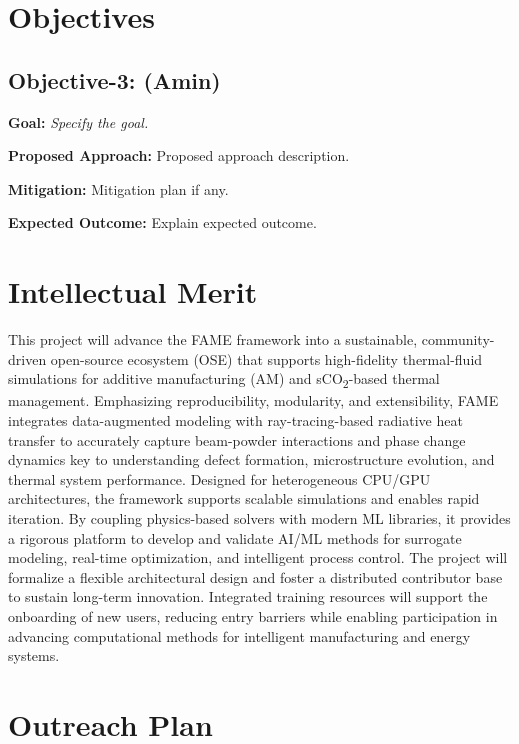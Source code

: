 \documentclass[11pt]{article}
\newcommand{\CO}[1]{CO\textsubscript{#1}}
\begin{document}
\section{Objectives}
\label{sec:objectives}
\subsection{Objective-3: (Amin)}
\label{sec:object3}


\noindent
\textbf{\textcolor{FlyersRed}{{Goal:}}}
\textit{Specify the goal.}



\noindent
\textbf{\textcolor{FlyersRed}{{Proposed Approach:}}}
Proposed approach description.

\noindent
\textbf{\textcolor{FlyersRed}{{Mitigation:}}}
Mitigation plan if any.


\textbf{\textcolor{FlyersRed}{{Expected Outcome:}}}
Explain expected outcome. 


\section{Intellectual Merit}
This project will advance the FAME framework into a sustainable, community-driven open-source ecosystem (OSE) that supports high-fidelity thermal-fluid simulations for additive manufacturing (AM) and s\CO{2}-based thermal management. Emphasizing reproducibility, modularity, and extensibility, FAME integrates data-augmented modeling with ray-tracing-based radiative heat transfer to accurately capture beam-powder interactions and phase change dynamics key to understanding defect formation, microstructure evolution, and thermal system performance. Designed for heterogeneous CPU/GPU architectures, the framework supports scalable simulations and enables rapid iteration. By coupling physics-based solvers with modern ML libraries, it provides a rigorous platform to develop and validate AI/ML methods for surrogate modeling, real-time optimization, and intelligent process control. The project will formalize a flexible architectural design and foster a distributed contributor base to sustain long-term innovation. Integrated training resources will support the onboarding of new users, reducing entry barriers while enabling participation in advancing computational methods for intelligent manufacturing and energy systems.
 
\section{Outreach Plan}  
\end{document}
